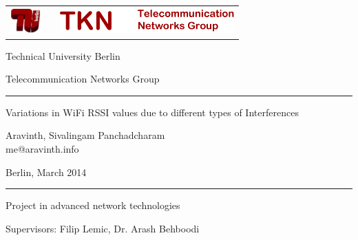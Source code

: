 \documentclass[11pt,a4paper,headinclude,footinclude,chapterprefix=on]{scrreprt}
\makeatletter
\newcommand{\trdate}{March 2014}
\newcommand{\trauthor}{Aravinth, Sivalingam Panchadcharam}
\newcommand{\tremail}{me@aravinth.info}
\newcommand{\trtitle}{Variations in WiFi RSSI values due to different types of Interferences}
\makeatother
\begin{document}
 


{ \sffamily

\thispagestyle{empty} 
\begin{tabularx}
	{\columnwidth}{cXc} 
	\includegraphics[height=1cm]{Images/TU-Logo-3D-rot.pdf} & & 
	\includegraphics[height=1cm]{Images/tknlogo.pdf} \\
\end{tabularx}

\vspace{1.0cm} 
\begin{center}
	{\huge 
	\noindent Technical University Berlin
	
	\vspace{0.5cm}
	
	\noindent Telecommunication Networks Group 
	\begin{center}
		\rule{15.5cm}{0.4pt} 
	\end{center}
	} 
\end{center}
\begin{minipage}
	[][11.0cm][c]{14.5cm} {\Huge 
	\begin{center}
		\trtitle 
	\end{center}
	\begin{center}
		\trauthor \\
		{\Large \tremail} 
	\end{center}
	\begin{center}
		Berlin, \trdate 
	\end{center}
	
	\vspace{0.5cm}
	
	} 
\end{minipage}

\setlength{\fboxrule}{0.4pt} \setlength{\fboxsep}{0.4pt} 
\begin{center}
	
	\rule{15.5cm}{0.4pt}
	
	\vspace{0.5cm}
	
	{\huge {Project in advanced network technologies}}
	
	\vspace{0.5cm}
	
	{\huge Supervisors: Filip Lemic, Dr. Arash Behboodi}
	
	\vspace{0.5cm} 
\end{center}
}
\end{document}
